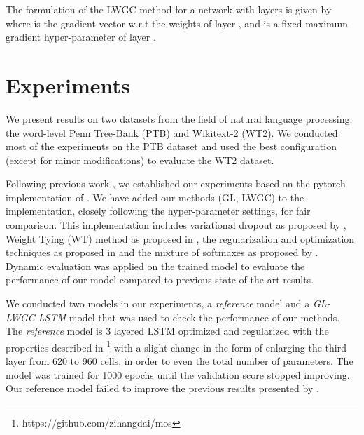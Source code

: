 \documentclass{article}
\begin{document}
The formulation of the LWGC method for a network with  layers is given by 
 where  is the gradient vector w.r.t the weights of layer , and  is a fixed maximum gradient hyper-parameter of layer .

\section{Experiments}
We present results on two datasets from the field of natural language processing, the word-level Penn Tree-Bank (PTB) and Wikitext-2 (WT2). We conducted most of the experiments on the PTB dataset and used the best configuration (except for minor modifications) to evaluate the WT2 dataset.

Following previous work \cite{melis2017state}, we established our experiments based on the pytorch implementation of \citet{mos}.
We have added our methods (GL, LWGC) to the implementation, closely following the hyper-parameter settings, for fair comparison. 
This implementation includes variational dropout as proposed by \cite{VariationalDropout}, Weight Tying (WT) method as proposed in \cite{WT}, the regularization and optimization techniques as proposed in \cite{Regularizing_Optimizing_LSTM_LM} and the mixture of softmaxes as proposed by \cite{mos}. 
Dynamic evaluation \cite{dynamicEval} was applied on the trained model to evaluate the performance of our model compared to previous state-of-the-art results.

We conducted two models in our experiments, a \textit{reference} model and a \textit{GL-LWGC LSTM} model that was used to check the performance of our methods. The \textit{reference} model is 3 layered LSTM optimized and regularized with the properties described in \cite{mos}\footnote[3]{https://github.com/zihangdai/mos} with a slight change in the form of enlarging the third layer from 620 to 960 cells, in order to even the total number of parameters. The model was trained for 1000 epochs until the validation score stopped improving. Our reference model failed to improve the previous results presented by \cite{mos}. 
\end{document}
